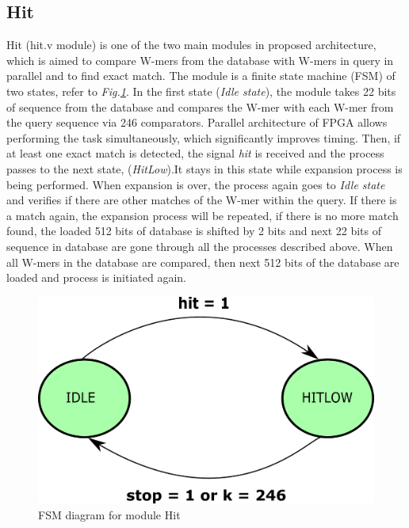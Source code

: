 \subsection{Hit}
\quad Hit (hit.v module) is one of the two main modules in proposed architecture, which is aimed to compare W-mers from the database with W-mers in query in parallel and to find exact match. The module is a finite state machine (FSM) of two states, refer to \textit{Fig.\ref{fig:hitFSM}}. In the first state (\textit{Idle state}), the module takes 22 bits of sequence from the database and compares the W-mer with each W-mer from the query sequence via 246 comparators. Parallel architecture of FPGA allows performing the task simultaneously, which significantly improves timing. Then, if at least one exact match is detected, the signal \textit{hit} is received and the process passes to the next state, (\textit{HitLow}).It stays in this state while expansion process is being performed. When expansion is over, the process again goes to \textit{Idle state} and verifies if there are other matches of the W-mer within the query. If there is a match again, the expansion process will be repeated, if there is no more match found, the loaded 512 bits of database is shifted by 2 bits and next 22 bits of sequence in database are gone through all the processes described above. When all W-mers in the database are compared, then next 512 bits of the database are loaded and process is initiated again. 

\begin{figure}[h!]
\centering
\includegraphics[width=\columnwidth]{Figures/hitFSM.pdf}
\caption{FSM diagram for module Hit} \label{fig:hitFSM}
\end{figure}



